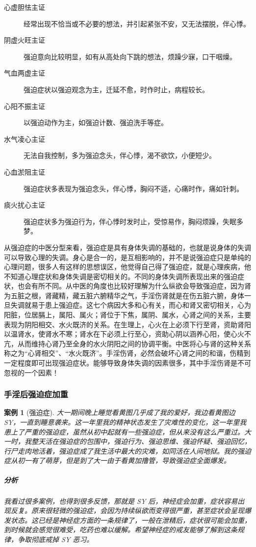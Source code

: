 \documentclass{ctexart}
\newtheorem{case}{案例}
\begin{document}
\begin{description}
    \item[心虚胆怯主证] 经常出现不恰当或不必要的想法，并引起紧张不安，又无法摆脱，伴心悸。
    \item[阴虚火旺主证] 强迫意向比较明显，如有从高处向下跳的想法，烦躁少寐，口干咽燥。
    \item[气血两虚主证] 强迫症状以强迫观念为主，迁延不愈，时作时止，病程较长。
    \item[心阳不振主证] 以强迫动作为主，如强迫计数、强迫洗手等症。
    \item[水气凌心主证] 无法自我控制，多为强迫念头，伴心悸，渴不欲饮，小便短少。
    \item[心血淤阻主证] 强迫症状多表现为强迫念头，伴心悸，胸闷不适，心痛时作，痛如针刺。
    \item[痰火扰心主证] 强迫症状多为强迫行为，伴心悸时发时止，受惊易作，胸闷烦躁，失眠多梦。
\end{description}

从强迫症的中医分型来看，强迫症是具有身体失调的基础的，也就是说身体的失调可以导致心理的失调。身心是合一的，是互相影响的，并不是说强迫症只是单纯的心理问题，很多人有这样的思想误区，他觉得自己得了强迫症，就是心理疾病，他不知道心理症状和身体失调是密切相关的。不同的身体失调所表现出来的强迫症状，也会有所不同。从中医的角度也比较好理解为什么纵欲会导致强迫症，因为肾为五脏之根，肾藏精，藏五脏六腑精华之气，手淫伤肾就是在伤五脏六腑，身体一旦失调就易于患上强迫症。这七个病因大多和心有关，而心和肾又密切相关，心为阳脏，位居膈上，属阳、属火；肾位于下焦，属阴、属水，心肾之间的关系，主要表现为阴阳相交、水火既济的关系。在生理上，心火在上必须下行至肾，资助肾阳以温肾水，使肾水不寒；肾水在下必须上行至心，资助心阴以涵养心阳，使心火不亢，从而维持心肾乃至全身的水火阴阳之间的协调平衡。中医将心与肾的这种关系称之为“心肾相交”、“水火既济”。手淫伤肾，必然会破坏心肾之间的和谐，伤精到一定程度即可出现强迫症状。能够导致身体失调的因素很多，其中手淫伤肾是不可忽视的一个因素！

\subsubsection{手淫后强迫症加重}

\begin{case}[强迫症]
    大一期间晚上睡觉看黄图几乎成了我的爱好，我边看黄图边 SY，一直到睡意袭来。这一年里我的精神状态发生了灾难性的变化，这一年里我患上了严重的强迫症，虽然从初中起就有一些强迫症，但从来没有这么严重过。大一时，我整天活在强迫症的包围中，强迫行为、强迫思维、强迫怀疑、强迫回忆，行尸走肉地活着，强迫症成了我生活中最大的灾难，如同活在人间地狱。我的强迫症从初一有了萌芽，但是到了大一由于看黄加撸管，导致强迫症全面爆发。
    \subparagraph{分析} 我看过很多案例，也得到很多反馈，那就是 SY 后，神经症会加重，症状容易出现反复。原来很轻微的强迫症，会因为持续纵欲而变得很严重，甚至症状会呈现爆发状态。这已经是神经症方面的一条规律了，一般在泄精后，症状很可能会加重，到时候就会感觉很难受，吃药也难以缓解。希望神经症的戒友能够了解到这条规律，争取彻底戒掉 SY 恶习。
\end{case}
\end{document}
